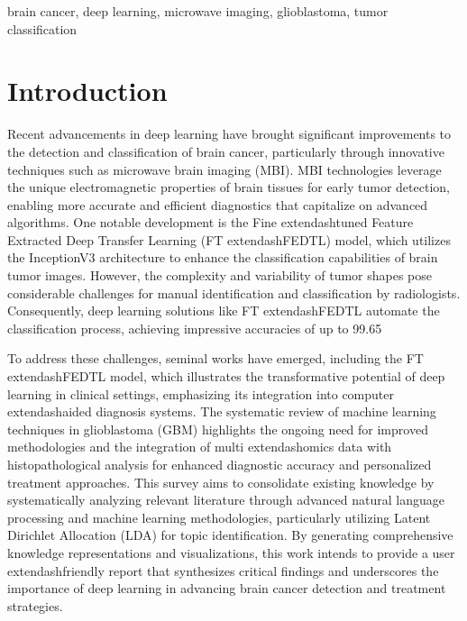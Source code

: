 \documentclass[runningheads]{llncs}
\begin{document}
\begin{keywords}
brain cancer, deep learning, microwave imaging, glioblastoma, tumor classification
\end{keywords}

\section{Introduction}
Recent advancements in deep learning have brought significant improvements to the detection and classification of brain cancer, particularly through innovative techniques such as microwave brain imaging (MBI). MBI technologies leverage the unique electromagnetic properties of brain tissues for early tumor detection, enabling more accurate and efficient diagnostics that capitalize on advanced algorithms. One notable development is the Fine	extendash{}tuned Feature Extracted Deep Transfer Learning (FT	extendash{}FEDTL) model, which utilizes the InceptionV3 architecture to enhance the classification capabilities of brain tumor images. However, the complexity and variability of tumor shapes pose considerable challenges for manual identification and classification by radiologists. Consequently, deep learning solutions like FT	extendash{}FEDTL automate the classification process, achieving impressive accuracies of up to 99.65%

To address these challenges, seminal works have emerged, including the FT	extendash{}FEDTL model, which illustrates the transformative potential of deep learning in clinical settings, emphasizing its integration into computer	extendash{}aided diagnosis systems. The systematic review of machine learning techniques in glioblastoma (GBM) highlights the ongoing need for improved methodologies and the integration of multi	extendash{}omics data with histopathological analysis for enhanced diagnostic accuracy and personalized treatment approaches. This survey aims to consolidate existing knowledge by systematically analyzing relevant literature through advanced natural language processing and machine learning methodologies, particularly utilizing Latent Dirichlet Allocation (LDA) for topic identification. By generating comprehensive knowledge representations and visualizations, this work intends to provide a user	extendash{}friendly report that synthesizes critical findings and underscores the importance of deep learning in advancing brain cancer detection and treatment strategies.
\end{document}
